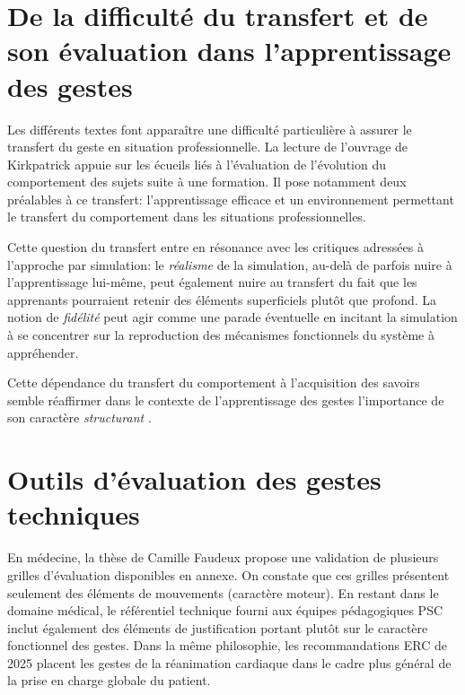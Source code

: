 \documentclass{article}
\begin{document}
\section{De la difficulté du transfert et de son évaluation dans 
l'apprentissage des gestes}

Les différents textes font apparaître une difficulté particulière à
assurer le transfert du geste en situation professionnelle. La lecture
de l'ouvrage de Kirkpatrick \cite{kirkpatrick_evaluating_2009} appuie sur
les écueils liés à l'évaluation de l'évolution du comportement des sujets
suite à une formation. Il pose notamment deux préalables à ce transfert:
l'apprentissage efficace et un environnement permettant le transfert du
comportement dans les situations professionnelles.

Cette question du transfert entre en résonance avec les critiques 
adressées à l'approche par simulation: le \emph{réalisme} de la simulation,
au-delà de parfois nuire à l'apprentissage lui-même, peut également nuire
au transfert du fait que les apprenants pourraient retenir des éléments
superficiels plutôt que profond. La notion de \emph{fidélité} peut agir
comme une parade éventuelle en incitant la simulation à se concentrer sur
la reproduction des mécanismes fonctionnels du système à appréhender.

Cette dépendance du transfert du comportement à l'acquisition des savoirs
semble réaffirmer dans le contexte de l'apprentissage des gestes 
l'importance de son caractère \emph{structurant} \cite{vadcard_gestes_2022}.


\section{Outils d'évaluation des gestes techniques}

En médecine, la thèse de Camille Faudeux \cite{faudeux_sfp_2014} 
\cite{faudeux_formation_2015} propose une validation de plusieurs grilles 
d'évaluation disponibles en annexe. On constate que ces grilles 
présentent seulement des éléments de mouvements (caractère moteur).
En restant dans le domaine médical, le référentiel technique fourni aux 
équipes pédagogiques PSC \cite{direction_generale_de_la_securite_civile_et_de_la_gestion_des_risques_references_2026} 
inclut également des éléments de justification portant plutôt sur le 
caractère fonctionnel des gestes.
Dans la même philosophie, les recommandations ERC de 2025 
\cite{greif_european_2025} placent les gestes de la réanimation cardiaque 
dans le cadre plus général de la prise en charge globale du patient.
\\
\end{document}
